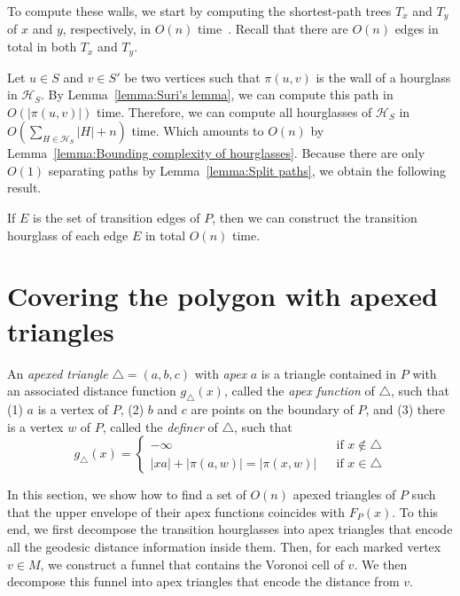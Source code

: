 \documentclass[a4paper,UKenglish]{lipics}
\newcommand{\F}[2]{\ensuremath{F_{\scriptscriptstyle #1}(#2)}}
\newcommand{\g}[2]{\ensuremath{|\pi(#1, #2)|}}
\newcommand{\p}[2]{\ensuremath{\pi(#1, #2)}}
\begin{document}
To compute these walls, we start by computing the shortest-path trees $T_x$ and $T_y$ of $x$ and $y$, respectively, in $O(n)$ time~\cite{guibasShortestPathTree}. Recall that there are $O(n)$ edges in total in both $T_x$ and $T_y$.

Let $u\in S$ and $v\in S'$ be two vertices such that $\p{u}{v}$ is the wall of a hourglass in $\mathcal H_S$.
By Lemma~\ref{lemma:Suri's lemma}, we can compute this path in $O(|\p{u}{v}|)$ time. 
Therefore, we can compute all hourglasses of $\mathcal H_S$ in $O(\sum_{H\in \mathcal H_S} |H| + n)$ time. 
Which amounts to $O(n)$ by Lemma~\ref{lemma:Bounding complexity of hourglasses}. 
Because there are only $O(1)$ separating paths by Lemma~\ref{lemma:Split paths}, we obtain the following result.

\begin{lemma}\label{lemma: Hourglass partition}
If $E$ is the set of transition edges of $P$, then we can construct the transition hourglass of each edge $E$ in total $O(n)$ time.
\end{lemma}

\section{Covering the polygon with apexed triangles}\label{Section:Computing apexed triangles}
An \emph{apexed triangle} $\triangle = (a,b,c)$ with \emph{apex} $a$ is a triangle contained in $P$ with an associated distance function $g_\triangle(x)$, called the \emph{apex function} of $\triangle$, such that (1) $a$ is a vertex of $P$, (2) $b$ and $c$ are points on the boundary of $P$, and (3) there is a  vertex $w$ of  $P$, called the \emph{definer} of $\triangle$, such that
$$g_\triangle(x) = \left\{ \begin{array}{lll}
-\infty&&\text{if $x\notin \triangle$}\\
|xa| + \g{a}{w} = \g{x}{w} && \text{if $x\in \triangle$}
\end{array}\right.$$

In this section, we show how to find a set of $O(n)$ apexed triangles of $P$ such that the upper envelope of their apex functions coincides with $\F{P}{x}$.
To this end, we first decompose the transition hourglasses into apex triangles that encode all the geodesic distance information inside them. Then, for each marked vertex $v\in M$, we construct a funnel that contains the Voronoi cell of $v$.  We then decompose this funnel into apex triangles that encode the distance from $v$.
\end{document}

